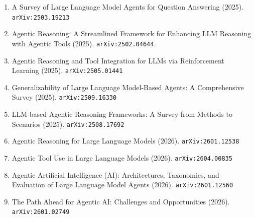 \documentclass[11pt]{article}
\begin{document}
\begin{enumerate}
  \item A Survey of Large Language Model Agents for Question Answering (2025). \texttt{arXiv:2503.19213}
  \item Agentic Reasoning: A Streamlined Framework for Enhancing LLM Reasoning with Agentic Tools (2025). \texttt{arXiv:2502.04644}
  \item Agentic Reasoning and Tool Integration for LLMs via Reinforcement
  Learning (2025). \texttt{arXiv:2505.01441}
  \item Generalizability of Large Language Model-Based Agents: A Comprehensive Survey (2025). \texttt{arXiv:2509.16330}
  \item LLM-based Agentic Reasoning Frameworks: A Survey from Methods to Scenarios (2025). \texttt{arXiv:2508.17692}
  \item Agentic Reasoning for Large Language Models (2026). \texttt{arXiv:2601.12538}
  \item Agentic Tool Use in Large Language Models (2026). \texttt{arXiv:2604.00835}
  \item Agentic Artificial Intelligence (AI): Architectures, Taxonomies, and Evaluation of Large Language Model Agents (2026). \texttt{arXiv:2601.12560}
  \item The Path Ahead for Agentic AI: Challenges and Opportunities (2026). \texttt{arXiv:2601.02749}
\end{enumerate}
\end{document}

